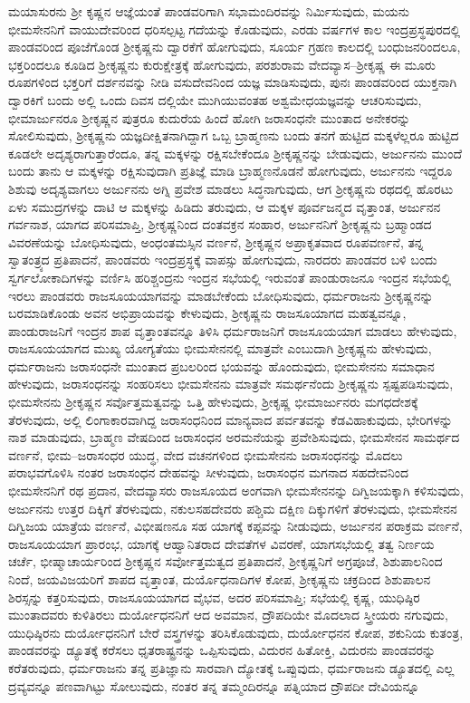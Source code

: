 ಮಯಾಸುರನು ಶ‍್ರೀ ಕೃಷ್ಣನ ಆಜ್ಞೆಯಂತೆ ಪಾಂಡವರಿಗಾಗಿ ಸಭಾಮಂದಿರವನ್ನು ನಿರ್ಮಿಸುವುದು, ಮಯನು ಭೀಮಸೇನನಿಗೆ ವಾಯುದೇವರಿಂದ ಧರಿಸಲ್ಪಟ್ಟ ಗದೆಯನ್ನು ಕೊಡುವುದು, ಎರಡು ವರ್ಷಗಳ ಕಾಲ ಇಂದ್ರಪ್ರಸ್ಥಪುರದಲ್ಲಿ ಪಾಂಡವರಿಂದ ಪೂಜೆಗೊಂಡ ಶ‍್ರೀಕೃಷ್ಣನು ದ್ವಾರಕೆಗೆ ಹೋಗುವುದು, ಸೂರ್ಯ ಗ್ರಹಣ ಕಾಲದಲ್ಲಿ ಬಂಧುಜನರಿಂದಲೂ, ಭಕ್ತರಿಂದಲೂ ಕೂಡಿದ ಶ‍್ರೀಕೃಷ್ಣನು ಕುರುಕ್ಷೇತ್ರಕ್ಕೆ ಹೋಗುವುದು, ಪರಶುರಾಮ ವೇದವ್ಯಾಸ–ಶ‍್ರೀಕೃಷ್ಣ ಈ ಮೂರು ರೂಪಗಳಿಂದ ಭಕ್ತರಿಗೆ ದರ್ಶನವನ್ನು ನೀಡಿ ವಸುದೇವನಿಂದ ಯಜ್ಞ ಮಾಡಿಸುವುದು, ಪುನಃ ಪಾಂಡವರಿಂದ ಯುಕ್ತನಾಗಿ ದ್ವಾರಕಿಗೆ ಬಂದು ಅಲ್ಲಿ ಒಂದು ದಿವಸ ದಲ್ಲಿಯೇ ಮುಗಿಯುವಂತಹ ಅಶ್ವಮೇಧಯಜ್ಞವನ್ನು ಆಚರಿಸುವುದು, ಭೀಮಾರ್ಜುನರೂ ಶ‍್ರೀಕೃಷ್ಣನ ಪುತ್ರರೂ ಕುದುರೆಯ ಹಿಂದೆ ಹೋಗಿ ಜರಾಸಂಧನೇ ಮುಂತಾದ ಅನೇಕರನ್ನು ಸೋಲಿಸುವುದು, ಶ‍್ರೀಕೃಷ್ಣನು ಯಜ್ಞದೀಕ್ಷಿತನಾಗಿದ್ದಾಗ ಒಬ್ಬ ಬ್ರಾಹ್ಮಣನು ಬಂದು ತನಗೆ ಹುಟ್ಟಿದ ಮಕ್ಕಳೆಲ್ಲರೂ ಹುಟ್ಟಿದ ಕೂಡಲೇ ಅದೃಶ್ಯರಾಗುತ್ತಾರೆಂದೂ, ತನ್ನ ಮಕ್ಕಳನ್ನು ರಕ್ಷಿಸಬೇಕೆಂದೂ ಶ‍್ರೀಕೃಷ್ಣನನ್ನು ಬೇಡುವುದು, ಅರ್ಜುನನು ಮುಂದೆ ಬಂದು ತಾನು ಆ ಮಕ್ಕಳನ್ನು ರಕ್ಷಿಸುವುದಾಗಿ ಪ್ರತಿಜ್ಞೆ ಮಾಡಿ ಬ್ರಾಹ್ಮಣನೊಡನೆ ಹೋಗುವುದು, ಅರ್ಜುನನು ಇದ್ದರೂ ಶಿಶುವು ಅದೃಶ್ಯವಾಗಲು ಅರ್ಜುನನು ಅಗ್ನಿ ಪ್ರವೇಶ ಮಾಡಲು ಸಿದ್ಧನಾಗುವುದು, ಆಗ ಶ‍್ರೀಕೃಷ್ಣನು ರಥದಲ್ಲಿ ಹೊರಟು ಏಳು ಸಮುದ್ರಗಳನ್ನು ದಾಟಿ ಆ ಮಕ್ಕಳನ್ನು ಹಿಡಿದು ತರುವುದು, ಆ ಮಕ್ಕಳ ಪೂರ್ವಜನ್ಮದ ವೃತ್ತಾಂತ, ಅರ್ಜುನನ ಗರ್ವನಾಶ, ಯಾಗದ ಪರಿಸಮಾಪ್ತಿ, ಶ‍್ರೀಕೃಷ್ಣನಿಂದ ದಂತವಕ್ರನ ಸಂಹಾರ, ಅರ್ಜುನನಿಗೆ ಶ‍್ರೀಕೃಷ್ಣನು ಬ್ರಹ್ಮಾಂಡದ ವಿವರಣೆಯನ್ನು ಬೋಧಿಸುವುದು, ಅಂಧಂತಮಸ್ಸಿನ ವರ್ಣನೆ, ಶ‍್ರೀಕೃಷ್ಣನ ಅಪ್ರಾಕೃತವಾದ ರೂಪವರ್ಣನೆ, ತನ್ನ ಸ್ವಾತಂತ್ರ್ಯದ ಪ್ರತಿಪಾದನೆ, ಪಾಂಡವರು ಇಂದ್ರಪ್ರಸ್ಥಕ್ಕೆ ವಾಪಸ್ಸು ಹೋಗುವುದು, ನಾರದರು ಪಾಂಡವರ ಬಳಿ ಬಂದು ಸ್ವರ್ಗಲೋಕಾದಿಗಳನ್ನು ವರ್ಣಿಸಿ ಹರಿಶ್ಚಂದ್ರನು ಇಂದ್ರನ ಸಭೆಯಲ್ಲಿ ಇರುವಂತೆ ಪಾಂಡುರಾಜನೂ ಇಂದ್ರನ ಸಭೆಯಲ್ಲಿ ಇರಲು ಪಾಂಡವರು ರಾಜಸೂಯಯಾಗವನ್ನು ಮಾಡಬೇಕೆಂದು ಬೋಧಿಸುವುದು, ಧರ್ಮರಾಜನು ಶ‍್ರೀಕೃಷ್ಣನನ್ನು ಬರಮಾಡಿಕೊಂಡು ಅವನ ಅಭಿಪ್ರಾಯವನ್ನು ಕೇಳುವುದು, ಶ‍್ರೀಕೃಷ್ಣನು ರಾಜಸೂಯಾಗದ ಮಹತ್ವವನ್ನೂ, ಪಾಂಡುರಾಜನಿಗೆ ಇಂದ್ರನ ಶಾಪ ವೃತ್ತಾಂತವನ್ನೂ ತಿಳಿಸಿ ಧರ್ಮರಾಜನಿಗೆ ರಾಜಸೂಯಯಾಗ ಮಾಡಲು ಹೇಳುವುದು, ರಾಜಸೂಯಯಾಗದ ಮುಖ್ಯ ಯೋಗ್ಯತೆಯು ಭೀಮಸೇನನಲ್ಲಿ ಮಾತ್ರವೇ ಎಂಬುದಾಗಿ ಶ‍್ರೀಕೃಷ್ಣನು ಹೇಳುವುದು, ಧರ್ಮರಾಜನು ಜರಾಸಂಧನೇ ಮುಂತಾದ ಪ್ರಬಲರಿಂದ ಭಯವನ್ನು ಹೊಂದುವುದು, ಭೀಮಸೇನನು ಸಮಾಧಾನ ಹೇಳುವುದು, ಜರಾಸಂಧನನ್ನು ಸಂಹರಿಸಲು ಭೀಮಸೇನನು ಮಾತ್ರವೇ ಸಮರ್ಥನೆಂದು ಶ‍್ರೀಕೃಷ್ಣನು ಸ್ಪಷ್ಟಪಡಿಸುವುದು, ಭೀಮಸೇನನು ಶ‍್ರೀಕೃಷ್ಣನ ಸರ್ವೊತ್ತಮತ್ವವನ್ನು ಒತ್ತಿ ಹೇಳುವುದು, ಶ‍್ರೀಕೃಷ್ಣ ಭೀಮಾರ್ಜುನರು ಮಗಧದೇಶಕ್ಕೆ ತೆರಳುವುದು, ಅಲ್ಲಿ ಲಿಂಗಾಕಾರವಾಗಿದ್ದ ಜರಾಸಂಧನಿಂದ ಮಾನ್ಯವಾದ ಪರ್ವತವನ್ನು ಕೆಡವಿಹಾಕುವುದು, ಭೇರಿಗಳನ್ನು ನಾಶ ಮಾಡುವುದು, ಬ್ರಾಹ್ಮಣ ವೇಷದಿಂದ ಜರಾಸಂಧನ ಅರಮನೆಯನ್ನು ಪ್ರವೇಶಿಸುವುದು, ಭೀಮಸೇನನ ಸಾಮರ್ಥದ ವರ್ಣನೆ, ಭೀಮ–ಜರಾಸಂಧರ ಯುದ್ಧ, ವೇದ ವಚನಗಳಿಂದ ಭೀಮಸೇನನು ಜರಾಸಂಧನನ್ನು ಮೊದಲು ಪರಾಭವಗೊಳಿಸಿ ನಂತರ ಜರಾಸಂಧನ ದೇಹವನ್ನು ಸೀಳುವುದು, ಜರಾಸಂಧನ ಮಗನಾದ ಸಹದೇವನಿಂದ ಭೀಮಸೇನನಿಗೆ ರಥ ಪ್ರದಾನ, ವೇದವ್ಯಾಸರು ರಾಜಸೂಯದ ಅಂಗವಾಗಿ ಭೀಮಸೇನನನ್ನು ದಿಗ್ವಿಜಯಕ್ಕಾಗಿ ಕಳಿಸುವುದು, ಅರ್ಜುನನು ಉತ್ತರ ದಿಕ್ಕಿಗೆ ತೆರಳುವುದು, ನಕುಲಸಹದೇವರು ಪಶ್ಚಿಮ ದಕ್ಷಿಣ ದಿಕ್ಕುಗಳಿಗೆ ತೆರಳುವುದು, ಭೀಮಸೇನನ ದಿಗ್ವಿಜಯ ಯಾತ್ರೆಯ ವರ್ಣನೆ, ವಿಭೀಷಣನೂ ಸಹ ಯಾಗಕ್ಕೆ ಕಪ್ಪವನ್ನು ನೀಡುವುದು, ಅರ್ಜುನನ ಪರಾಕ್ರಮ ವರ್ಣನೆ, ರಾಜಸೂಯಯಾಗ ಪ್ರಾರಂಭ, ಯಾಗಕ್ಕೆ ಆಹ್ವಾನಿತರಾದ ದೇವತೆಗಳ ವಿವರಣೆ, ಯಾಗಸಭೆಯಲ್ಲಿ ತತ್ವ ನಿರ್ಣಯ ಚರ್ಚೆ, ಭೀಷ್ಮಾಚಾರ್ಯರಿಂದ ಶ‍್ರೀಕೃಷ್ಣನ ಸರ್ವೋತ್ತಮತ್ವದ ಪ್ರತಿಪಾದನೆ, ಶ‍್ರೀಕೃಷ್ಣನಿಗೆ ಅಗ್ರಪೂಜೆ, ಶಿಶುಪಾಲನಿಂದ ನಿಂದೆ, ಜಯವಿಜಯರಿಗೆ ಶಾಪದ ವೃತ್ತಾಂತ, ದುರ್ಯೊಧನಾದಿಗಳ ಕೋಪ, ಶ‍್ರೀಕೃಷ್ಣನು ಚಕ್ರದಿಂದ ಶಿಶುಪಾಲನ ಶಿರಸ್ಸನ್ನು ಕತ್ತರಿಸುವುದು, ರಾಜಸೂಯಯಾಗದ ವೈಭವ, ಅದರ ಪರಿಸಮಾಪ್ತಿ; ಸಭೆಯಲ್ಲಿ ಕೃಷ್ಣ, ಯುಧಿಷ್ಠಿರ ಮುಂತಾದವರು ಕುಳಿತಿರಲು ದುರ್ಯೋಧನನಿಗೆ ಆದ ಅವಮಾನ, ದ್ರೌಪದಿಯೇ ಮೊದಲಾದ ಸ್ತ್ರೀಯರು ನಗುವುದು, ಯುಧಿಷ್ಠಿರನು ದುರ್ಯೋಧನನಿಗೆ ಬೇರೆ ವಸ್ತ್ರಗಳನ್ನು ತರಿಸಿಕೊಡುವುದು, ದುರ್ಯೋಧನನ ಕೋಪ, ಶಕುನಿಯ ಕುತಂತ್ರ, ಪಾಂಡವರನ್ನು ಡ್ಯೂತಕ್ಕೆ ಕರೆಸಲು ಧೃತರಾಷ್ಟ್ರನನ್ನು ಒಪ್ಪಿಸುವುದು, ವಿದುರನ ಹಿತೋಕ್ತಿ, ವಿದುರನು ಪಾಂಡವರನ್ನು ಕರೆತರುವುದು, ಧರ್ಮರಾಜನು ತನ್ನ ಪ್ರತಿಜ್ಞಾನು ಸಾರವಾಗಿ ದ್ಯೋತಕ್ಕೆ ಒಪ್ಪುವುದು, ಧರ್ಮರಾಜನು ಡ್ಯೂತದಲ್ಲಿ ಎಲ್ಲ ದ್ರವ್ಯವನ್ನೂ ಪಣವಾಗಿಟ್ಟು ಸೋಲುವುದು, ನಂತರ ತನ್ನ ತಮ್ಮಂದಿರನ್ನೂ ಪತ್ನಿಯಾದ ದ್ರೌಪದೀ ದೇವಿಯನ್ನೂ 